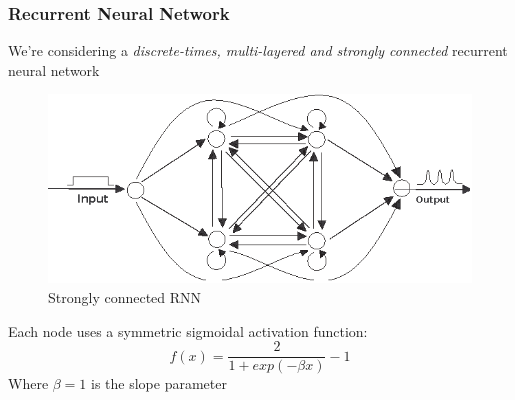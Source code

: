 \documentclass{beamer}
\begin{document}
\begin{frame}[fragile]
  \frametitle{Recurrent Neural Network}
  We're considering a \emph{discrete-times, multi-layered \mbox{and} strongly connected} recurrent neural network \\
  \begin{figure}
   \includegraphics[scale=0.7]{strongrnn}
   \caption{Strongly connected RNN}
  \end{figure}
  Each node uses a symmetric sigmoidal activation function:
  \begin{equation}
   f(x) = \frac{2}{1+exp(-\beta x)} - 1
  \end{equation}
  Where $\beta = 1$ is the slope parameter
\end{frame}
\end{document}
